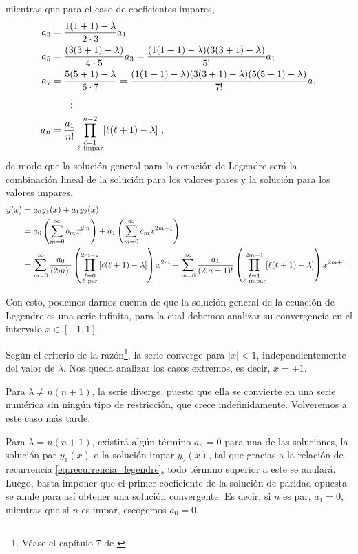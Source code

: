 mientras que para el caso de coeficientes impares,
\begin{align*}
    a_3 & = \frac{1(1+1) - \lambda}{2 \cdot 3}a_1 \\
    a_5 & = \frac{(3(3+1)-\lambda)}{4 \cdot 5}a_3 = \frac{(1(1+1) - \lambda)(3(3+1)-\lambda)}{5!} a_1 \\
    a_7 & = \frac{5(5+1) - \lambda}{6 \cdot 7} = \frac{(1(1+1) - \lambda)(3(3+1)-\lambda)(5(5+1) - \lambda)}{7!} a_1 \\
    & \qquad \vdots \\
    a_n & = \frac{a_1}{n!}\prod_{\substack{\ell=1 \\ \ell \mbox{ \scriptsize{impar}}}}^{n-2}[\ell (\ell+1) - \lambda] \ ,
\end{align*}
de modo que la solución general para la ecuación de Legendre será la combinación lineal de la solución para los valores pares y la solución para los valores impares,
\begin{align}
    y(x) & = a_0 y_{1}(x) + a_1 y_{2}(x) \nonumber \\
    & = a_0 \left( \sum_{m=0}^{\infty} b_{m} x^{2m} \right) + a_1 \left( \sum_{m=0}^{\infty} c_{m} x^{2m+1} \right) \nonumber \\
    & = \sum_{m=0}^{\infty} \frac{a_0}{(2m)!}\left( \prod_{\substack{\ell=0 \\ \ell \mbox{ \scriptsize{par}}}}^{2m-2}[\ell (\ell+1) - \lambda] \right)x^{2m} + \sum_{m=0}^{\infty} \frac{a_1}{(2m+1)!}\left( \prod_{\substack{\ell=1 \\ \ell \mbox{ \scriptsize{impar}}}}^{2m-1}[\ell (\ell+1) - \lambda] \right)x^{2m+1} \ . \label{eq:Legendre_series_solution}
\end{align}

Con esto, podemos darnos cuenta de que la solución general de la ecuación de Legendre es una serie infinita, para la cual debemos analizar su convergencia en el intervalo $x \in [-1,1]$.

Según el criterio de la razón\footnote{Véase el capítulo 7 de \cite{Barea}}, la serie converge para $|x|<1$, independientemente del valor de $\lambda$. Nos queda analizar los casos extremos, es decir, $x= \pm 1$.

Para $\lambda \neq n(n+1)$, la serie diverge, puesto que ella se convierte en una serie numérica sin ningún tipo de restricción, que crece indefinidamente. Volveremos a este caso más tarde.

Para $\lambda = n (n+1)$, existirá algún término $a_n=0$ para una de las soluciones, la solución par $y_1(x)$ o la solución impar $y_2(x)$, tal que gracias a la relación de recurrencia \eqref{eq:recurrencia_legendre}, todo término superior a este se anulará. Luego, basta imponer que el primer coeficiente de la solución de paridad opuesta se anule para así obtener una solución convergente. Es decir, si $n$ es par, $a_1=0$, mientras que si $n$ es impar, escogemos $a_0 = 0$.

